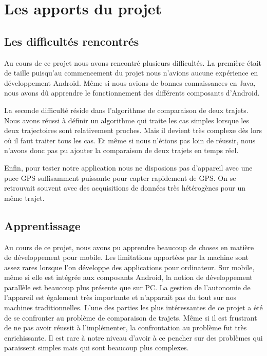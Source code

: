 \chapter{Les apports du projet}
\section{Les difficultés rencontrés}
Au cours de ce projet nous avons rencontré plusieurs difficultés. La première était de taille puisqu'au commencement du projet nous n'avions aucune expérience en développement Android. Même si nous avions de bonnes connaissances en Java, nous avons dû apprendre le fonctionnement des différents composants d'Android.\bigskip

La seconde difficulté réside dans l'algorithme de comparaison de deux trajets. Nous avons réussi à définir un algorithme qui traite les cas simples lorsque les deux trajectoires sont relativement proches. Mais il devient très complexe dès lors où il faut traiter tous les cas. Et même si nous n'étions pas loin de réussir, nous n'avons donc pas pu ajouter la comparaison de deux trajets en temps réel.\bigskip

Enfin, pour tester notre application nous ne disposions pas d'appareil avec une puce GPS suffisamment puissante pour capter rapidement de GPS. On se retrouvait souvent avec des acquisitions de données très hétérogènes pour un même trajet.\bigskip

\section{Apprentissage}
Au cours de ce projet, nous avons pu apprendre beaucoup de choses en matière de développement pour mobile. Les limitations apportées par la machine sont assez rares lorsque l'on développe des applications pour ordinateur. Sur mobile, même si elle est intégrée aux composants Android, la notion de développement parallèle est beaucoup plus présente que sur PC. La gestion de l'autonomie de l'appareil est également très importante et n'apparait pas du tout sur nos machines traditionnelles.
\bigskip
L'une des parties les plus intéressantes de ce projet a été de se confronter au problème de comparaison de trajets. Même si il est frustrant de ne pas avoir réussit à l'implémenter, la confrontation au problème fut très enrichissante. Il est rare à notre niveau d'avoir à ce pencher sur des problèmes qui paraissent simples mais qui sont beaucoup plus complexes.
